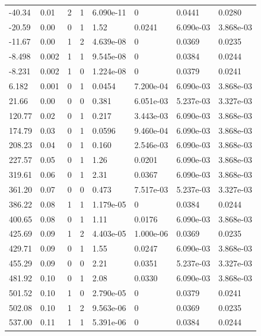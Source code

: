 \documentclass[preview]{standalone}
\begin{document}
{{\begin{tabular}{L{1.2cm}C{1.2cm} C{0.3cm}C{0.5cm} C{1.4cm}C{1.4cm} C{1.4cm}C{1.4cm}}
  -40.34  &  0.01  & 2     &  1 &  6.090e-11  & 0  & 0.0441 &  0.0280   \\ 
  -20.59  &  0.00  & 0     &  1 &  1.52  & 0.0241  & 6.090e-03 &  3.868e-03   \\ 
  -11.67  &  0.00  & 1     &  2 &  4.639e-08  & 0  & 0.0369 &  0.0235   \\ 
  -8.498  &  0.002  & 1     &  1 &  9.545e-08  & 0  & 0.0384 &  0.0244   \\ 
  -8.231  &  0.002  & 1     &  0 &  1.224e-08  & 0  & 0.0379 &  0.0241   \\ 
  6.182  &  0.001  & 0     &  1 &  0.0454  & 7.200e-04  & 6.090e-03 &  3.868e-03   \\ 
  21.66  &  0.00  & 0     &  0 &  0.381  & 6.051e-03  & 5.237e-03 &  3.327e-03   \\ 
  120.77  &  0.02  & 0     &  1 &  0.217  & 3.443e-03  & 6.090e-03 &  3.868e-03   \\ 
  174.79  &  0.03  & 0     &  1 &  0.0596  & 9.460e-04  & 6.090e-03 &  3.868e-03   \\ 
  208.23  &  0.04  & 0     &  1 &  0.160  & 2.546e-03  & 6.090e-03 &  3.868e-03   \\ 
  227.57  &  0.05  & 0     &  1 &  1.26  & 0.0201  & 6.090e-03 &  3.868e-03   \\ 
  319.61  &  0.06  & 0     &  1 &  2.31  & 0.0367  & 6.090e-03 &  3.868e-03   \\ 
  361.20  &  0.07  & 0     &  0 &  0.473  & 7.517e-03  & 5.237e-03 &  3.327e-03   \\ 
  386.22  &  0.08  & 1     &  1 &  1.179e-05  & 0  & 0.0384 &  0.0244   \\ 
  400.65  &  0.08  & 0     &  1 &  1.11  & 0.0176  & 6.090e-03 &  3.868e-03   \\ 
  425.69  &  0.09  & 1     &  2 &  4.403e-05  & 1.000e-06  & 0.0369 &  0.0235   \\ 
  429.71  &  0.09  & 0     &  1 &  1.55  & 0.0247  & 6.090e-03 &  3.868e-03   \\ 
  455.29  &  0.09  & 0     &  0 &  2.21  & 0.0351  & 5.237e-03 &  3.327e-03   \\ 
  481.92  &  0.10  & 0     &  1 &  2.08  & 0.0330  & 6.090e-03 &  3.868e-03   \\ 
  501.52  &  0.10  & 1     &  0 &  2.790e-05  & 0  & 0.0379 &  0.0241   \\ 
  502.08  &  0.10  & 1     &  2 &  9.563e-06  & 0  & 0.0369 &  0.0235   \\ 
  537.00  &  0.11  & 1     &  1 &  5.391e-06  & 0  & 0.0384 &  0.0244   \\ 

\end{tabular}}}
\end{document}
